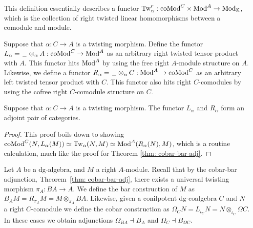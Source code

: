 \documentclass[../thesis.tex]{subfiles}
\begin{document}
            This definition essentially describes a functor $\tt{Tw}_\alpha^r: \tt{coMod}^C \times \tt{Mod}^A \rightarrow \tt{Mod}_\mathbb{K}$, which is the collection of right twisted linear homomorphisms between a comodule and module.

            Suppose that $\alpha: C \rightarrow A$ is a twisting morphism. Define the functor $L_\alpha = \argument \otimes_\alpha A: \tt{coMod}^C \rightarrow \tt{Mod}^A$ as an arbitrary right twisted tensor product with $A$. This functor hits $\tt{Mod}^A$ by using the free right $A$-module structure on $A$. Likewise, we define a functor $R_\alpha = \argument \otimes_\alpha C: \tt{Mod}^A \rightarrow \tt{coMod}^C$ as an arbitrary left twisted tensor product with $C$. This functor also hits right $C$-comodules by using the cofree right $C$-comodule structure on $C$.

            \begin{proposition}
                Suppose that $\alpha: C \rightarrow A$ is a twisting morphism. The functor $L_\alpha$ and $R_\alpha$ form an adjoint pair of categories.
                \begin{center}
                \end{center}
            \end{proposition}

            \begin{proof}
                This proof boils down to showing $\tt{coMod}^C(N, L_\alpha(M))\simeq \tt{Tw}_\alpha(N,M) \simeq \tt{Mod}^A(R_\alpha(N),M)$, which is a routine calculation, much like the proof for Theorem \ref{thm: cobar-bar-adj}.
            \end{proof}

            Let $A$ be a dg-algebra, and $M$ a right $A$-module. Recall that by the cobar-bar adjunction, Theorem~\ref{thm: cobar-bar-adj}, there exists a universal twisting morphism $\pi_A: BA \rightarrow A$. We define the bar construction of $M$ as $B_AM = R_{\pi_A}M = M\otimes_{\pi_A}BA$. Likewise, given a conilpotent dg-coalgebra $C$ and $N$ a right $C$-comodule we define the cobar construction as $\Omega_CN = L_{\iota_C}N = N\otimes_{\iota_C}\Omega C$. In these cases we obtain adjunctions $\Omega_{BA} \dashv B_A$ and $\Omega_C \dashv B_{\Omega C}$.
\end{document}
